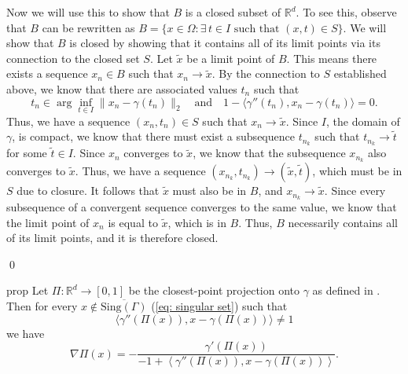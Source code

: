 \documentclass[11pt]{article}
\begin{document}
Now we will use this to show that $B$ is a closed subset of $\mathbb{R}^d$. To see this, observe that $B$ can be rewritten as $B = \{x \in \Omega: \exists \, t \in I \text{ such that }(x,t) \in S\}.$ We will show that $B$ is closed by showing that it contains all of its limit points via its connection to the closed set $S$. Let $\tilde{x}$ be a limit point of $B$. This means there exists a sequence $x_n \in B$ such that $x_n\rightarrow \tilde{x}$. By the connection to $S$ established above, we know that there are associated values $t_n$ such that 
\[t_n \in \arg\inf_{t \in I}\|x_n - \gamma(t_n)\|_2 \quad \text{and} \quad 1 - \langle\gamma''(t_n), x_n - \gamma(t_n)\rangle = 0.\]
Thus, we have a sequence $(x_n, t_n) \in S$ such that $x_n \rightarrow \tilde{x}$. Since $I$, the domain of $\gamma$, is compact, we know that there must exist a subsequence $t_{n_k}$ such that $t_{n_k}\rightarrow \tilde{t}$ for some $\tilde{t} \in I$. Since $x_n$ converges to $\tilde{x}$, we know that the subsequence $x_{n_k}$ also converges to $\tilde{x}$. Thus, we have a sequence $(x_{n_k}, t_{n_k}) \rightarrow (\tilde{x},\tilde{t})$, which must be in $S$ due to closure. It follows that $\tilde{x}$ must also be in $B$, and $x_{n_k} \rightarrow \tilde{x}$. Since every subsequence of a convergent sequence converges to the same value, we know that the limit point of $x_{n}$ is equal to $\tilde{x}$, which is in $B$. Thus, $B$ necessarily contains all of its limit points, and it is therefore closed.  

\qed{}



\begin{restatable}{prop}{} \label{prop: proj gradient}
    Let $\Pi: \mathbb{R}^d \rightarrow [0, 1]$ be the closest-point projection onto $\gamma$ as defined in . Then for every $x \notin \overline{\text{Sing}(\Gamma)}$ (\cref{eq: singular set}) such that 
    \[\langle\gamma''(\Pi(x)), x - \gamma(\Pi(x))\rangle \neq 1\]
    we have 
    \[\nabla\Pi(x)  = -\frac{\gamma'(\Pi(x))}{-1 + \left\langle\gamma''(\Pi(x)), x - \gamma(\Pi(x))\right\rangle}.\]
\end{restatable}
\end{document}
